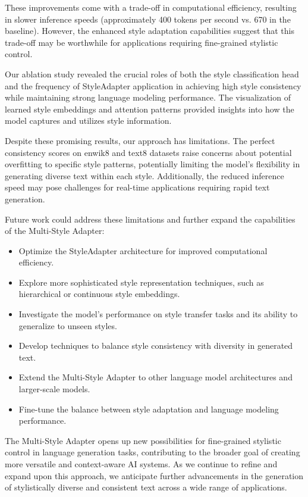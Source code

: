 \documentclass{article} %
\begin{document}
These improvements come with a trade-off in computational efficiency, resulting in slower inference speeds (approximately 400 tokens per second vs. 670 in the baseline). However, the enhanced style adaptation capabilities suggest that this trade-off may be worthwhile for applications requiring fine-grained stylistic control.

Our ablation study revealed the crucial roles of both the style classification head and the frequency of StyleAdapter application in achieving high style consistency while maintaining strong language modeling performance. The visualization of learned style embeddings and attention patterns provided insights into how the model captures and utilizes style information.

Despite these promising results, our approach has limitations. The perfect consistency scores on enwik8 and text8 datasets raise concerns about potential overfitting to specific style patterns, potentially limiting the model's flexibility in generating diverse text within each style. Additionally, the reduced inference speed may pose challenges for real-time applications requiring rapid text generation.

Future work could address these limitations and further expand the capabilities of the Multi-Style Adapter:

\begin{itemize}
    \item Optimize the StyleAdapter architecture for improved computational efficiency.
    \item Explore more sophisticated style representation techniques, such as hierarchical or continuous style embeddings.
    \item Investigate the model's performance on style transfer tasks and its ability to generalize to unseen styles.
    \item Develop techniques to balance style consistency with diversity in generated text.
    \item Extend the Multi-Style Adapter to other language model architectures and larger-scale models.
    \item Fine-tune the balance between style adaptation and language modeling performance.
\end{itemize}

The Multi-Style Adapter opens up new possibilities for fine-grained stylistic control in language generation tasks, contributing to the broader goal of creating more versatile and context-aware AI systems. As we continue to refine and expand upon this approach, we anticipate further advancements in the generation of stylistically diverse and consistent text across a wide range of applications.



\end{document}
